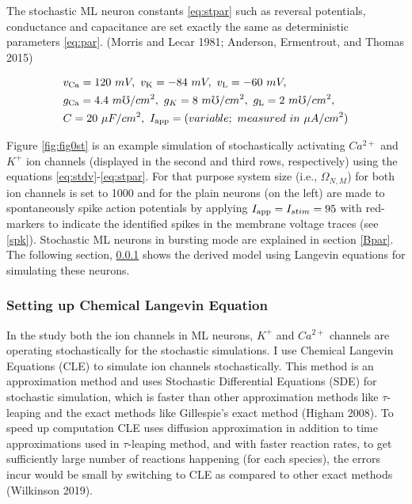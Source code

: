 \documentclass[
]{article}
\begin{document}
The stochastic ML neuron constants \eqref{eq:stpar} such as reversal potentials, conductance and capacitance are set exactly the same as deterministic parameters \eqref{eq:par}. (Morris and Lecar 1981; Anderson, Ermentrout, and Thomas 2015)

\begin{equation} \label{eq:stpar}
\begin{split}
&v_{\rm Ca} = 120\ mV,\  v_{\rm K} = -84\ mV,\ v_{\rm L} = -60\ mV,
\\ &g_{\rm Ca} = 4.4\ m\mho/cm^2, \ g_{K\rm } = 8\ m\mho/cm^2,\ 
    g_{\rm L} = 2\ m\mho/cm^2,
\\ &C = 20\ \mu F/cm^2,\ I_{\rm app} = (variable;\ measured\ in\ 
    \mu A/cm^2) 
\end{split}
\end{equation}

Figure \ref{fig:fig0st} is an example simulation of stochastically activating \(Ca^{2+}\) and \(K^+\) ion channels (displayed in the second and third rows, respectively) using the equations \eqref{eq:stdv}-\eqref{eq:stpar}. For that purpose system size (i.e., \(\Omega_{N,M}\)) for both ion channels is set to 1000 and for the plain neurons (on the left) are made to spontaneously spike action potentials by applying \(I_{\rm app}=I_{stim} = 95\) with red-markers to indicate the identified spikes in the membrane voltage traces (see \ref{spk}). Stochastic ML neurons in bursting mode are explained in section \ref{Bpar}. The following section, \ref{CLE} shows the derived model using Langevin equations for simulating these neurons.

\hypertarget{CLE}{%
\subsubsection{Setting up Chemical Langevin Equation}\label{CLE}}

In the study both the ion channels in ML neurons, \(K^+\) and \(Ca^{2+}\) channels are operating stochastically for the stochastic simulations. I use Chemical Langevin Equations (CLE) to simulate ion channels stochastically. This method is an approximation method and uses Stochastic Differential Equations (SDE) for stochastic simulation, which is faster than other approximation methods like \(\tau\)-leaping and the exact methods like Gillespie's exact method (Higham 2008). To speed up computation CLE uses diffusion approximation in addition to time approximations used in \(\tau\)-leaping method, and with faster reaction rates, to get sufficiently large number of reactions happening (for each species), the errors incur would be small by switching to CLE as compared to other exact methods (Wilkinson 2019).
\end{document}
